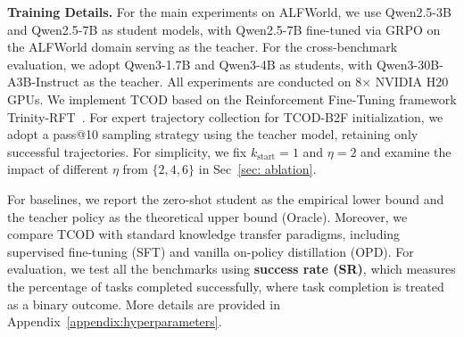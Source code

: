 \documentclass{article} %
\newcommand{\ours}{TCOD\xspace}
\begin{document}
\textbf{Training Details.}
For the main experiments on ALFWorld, we use Qwen2.5-3B and Qwen2.5-7B as student models, with Qwen2.5-7B fine-tuned via 
GRPO on the ALFWorld domain serving as the teacher.
For the cross-benchmark evaluation, we adopt Qwen3-1.7B and Qwen3-4B as students, with Qwen3-30B-A3B-Instruct as the teacher.
All experiments are conducted on 8$\times$ NVIDIA H20 GPUs.
We implement \ours based on the Reinforcement Fine-Tuning framework Trinity-RFT~\citep{pan2025trinityrftgeneralpurposeunifiedframework}. 
For expert trajectory collection for \ours-B2F initialization, we adopt a pass@10 sampling strategy using the teacher model, retaining only successful trajectories. 
For simplicity, we fix $k_{\text{start}} = 1$ and $\eta=2$ and examine the impact of different $\eta$ from $\{2, 4, 6\}$ in Sec~\ref{sec: ablation}. 


For baselines, we report the zero-shot student as the empirical lower bound and the teacher policy as the theoretical upper bound (Oracle). Moreover, we compare \ours with standard knowledge transfer paradigms, including supervised fine-tuning (SFT) and vanilla on-policy distillation (OPD). 
For evaluation, we test all the benchmarks using \textbf{success rate (SR)}, which measures the percentage of tasks completed successfully, where task completion is treated as a binary outcome. 
More details are provided in Appendix~\ref{appendix:hyperparameters}.
\end{document}
